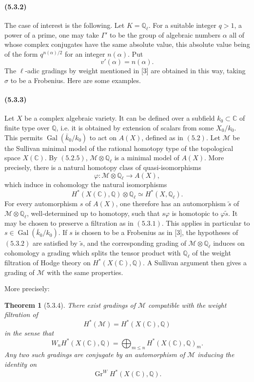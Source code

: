 \documentclass[11pt]{article}
\newtheorem{theorem}{Theorem}
\theoremstyle{remark}
\newcommand{\Ql}{\mathbb{Q}_\ell}
\newcommand{\QQ}{\mathbb{Q}}
\newcommand{\CC}{\mathbb{C}}
\begin{document}
\paragraph{(5.3.2)}
The case of interest is the following.  Let \(K=\Ql\).  For a suitable integer \(q>1\), a power of a prime, one may take \(\Gamma'\) to be the group of algebraic numbers \(\alpha\) all of whose complex conjugates have the same absolute value, this absolute value being of the form \(q^{n(\alpha)/2}\) for an integer \(n(\alpha)\).  Put
\[
v'(\alpha)=n(\alpha).
\]
The \(\ell\)-adic gradings by weight mentioned in [3] are obtained in this way, taking \(\sigma\) to be a Frobenius.  Here are some examples.

\paragraph{(5.3.3)}
Let \(X\) be a complex algebraic variety.  It can be defined over a subfield \(k_0\subset\CC\) of finite type over \(\QQ\), i.e. it is obtained by extension of scalars from some \(X_0/k_0\).  This permits \(\operatorname{Gal}(\bar k_0/k_0)\) to act on \(A(X)\), defined as in \((5.2)\).  Let \(\mathcal M\) be the Sullivan minimal model of the rational homotopy type of the topological space \(X(\CC)\).  By \((5.2.5)\), \(\mathcal M\otimes\Ql\) is a minimal model of \(A(X)\).  More precisely, there is a natural homotopy class of quasi-isomorphisms
\[
\varphi:\mathcal M\otimes\Ql \longrightarrow A(X),
\]
which induce in cohomology the natural isomorphisms
\[
H^*(X(\CC),\QQ)\otimes\Ql\simeq H^*(X,\Ql).
\]
For every automorphism \(s\) of \(A(X)\), one therefore has an automorphism \(\tilde s\) of \(\mathcal M\otimes\Ql\), well-determined up to homotopy, such that \(s\varphi\) is homotopic to \(\varphi\tilde s\).  It may be chosen to preserve a filtration as in \((5.3.1)\).  This applies in particular to \(s\in\operatorname{Gal}(\bar k_0/k_0)\).  If \(s\) is chosen to be a Frobenius as in [3], the hypotheses of \((5.3.2)\) are satisfied by \(\tilde s\), and the corresponding grading of \(\mathcal M\otimes\Ql\) induces on cohomology a grading which splits the tensor product with \(\Ql\) of the weight filtration of Hodge theory on \(H^*(X(\CC),\QQ)\).  A Sullivan argument then gives a grading of \(\mathcal M\) with the same properties.

More precisely:

\begin{theorem}[5.3.4]
There exist gradings of \(\mathcal M\) compatible with the weight filtration of
\[
H^*(\mathcal M)=H^*(X(\CC),\QQ)
\]
in the sense that
\[
W_nH^*(X(\CC),\QQ)=\bigoplus_{m\le n} H^*(X(\CC),\QQ)_m.
\]
Any two such gradings are conjugate by an automorphism of \(\mathcal M\) inducing the identity on
\[
\operatorname{Gr}^W H^*(X(\CC),\QQ).
\]
\end{theorem}
\end{document}
